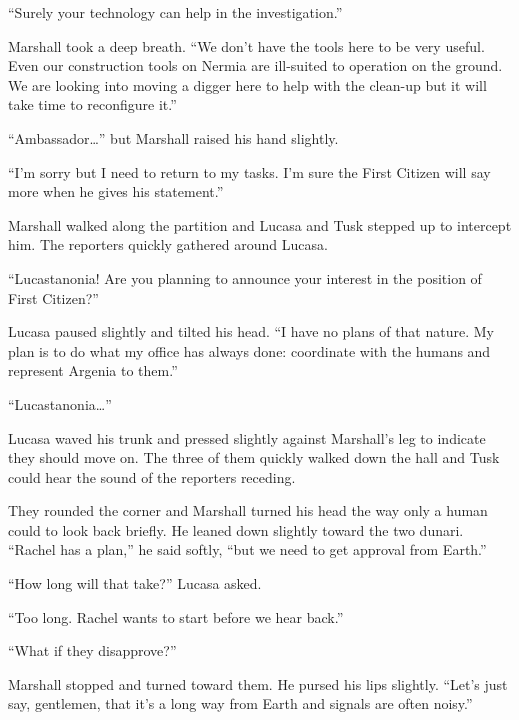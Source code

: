 ``Surely your technology can help in the investigation.''

Marshall took a deep breath. ``We don't have the tools here to be very useful. Even our
construction tools on Nermia are ill-suited to operation on the ground. We are looking into
moving a digger here to help with the clean-up but it will take time to reconfigure it.''

``Ambassador\ldots'' but Marshall raised his hand slightly.

``I'm sorry but I need to return to my tasks. I'm sure the First Citizen will say more when he
gives his statement.''

Marshall walked along the partition and Lucasa and Tusk stepped up to intercept him. The
reporters quickly gathered around Lucasa.

``Lucastanonia! Are you planning to announce your interest in the position of First Citizen?''

Lucasa paused slightly and tilted his head. ``I have no plans of that nature. My plan is to do
what my office has always done: coordinate with the humans and represent Argenia to them.''

``Lucastanonia\ldots''

Lucasa waved his trunk and pressed slightly against Marshall's leg to indicate they should move
on. The three of them quickly walked down the hall and Tusk could hear the sound of the
reporters receding.

They rounded the corner and Marshall turned his head the way only a human could to look back
briefly. He leaned down slightly toward the two dunari. ``Rachel has a plan,'' he said softly,
``but we need to get approval from Earth.''

``How long will that take?'' Lucasa asked.

``Too long. Rachel wants to start before we hear back.''

``What if they disapprove?''

Marshall stopped and turned toward them. He pursed his lips slightly. ``Let's just say,
gentlemen, that it's a long way from Earth and signals are often noisy.''
